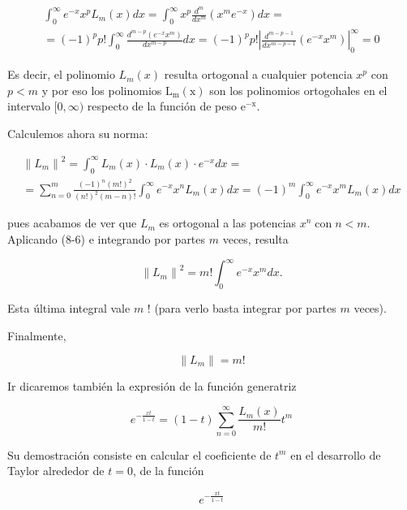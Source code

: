 \documentclass[10pt]{article}
\theoremstyle{plain}
\theoremstyle{definition}
\theoremstyle{remark}
\begin{document}
$$
\begin{gathered}
\int_{0}^{\infty} e^{-x} x^{p} L_{m}(x) d x=\int_{0}^{\infty} x^{p} \frac{d^{m}}{d x^{m}}\left(x^{m} e^{-x}\right) d x= \\
=(-1)^{p} p!\int_{0}^{\infty} \frac{d^{m-p}\left(e^{-x} x^{m}\right)}{d x^{m-p}} d x=(-1)^{p} p!\left|\frac{d^{m-p-1}}{d x^{m-p-1}}\left(e^{-x} x^{m}\right)\right|_{0}^{\infty}=0
\end{gathered}
$$

Es decir, el polinomio $L_{m}(x)$ resulta ortogonal a cualquier potencia $x^{p}$ con $p<m$ y por eso los polinomios $\mathrm{L}_{\mathrm{m}}(\mathrm{x})$ son los polinomios ortogohales en el intervalo $[0, \infty)$ respecto de la función de peso $\mathrm{e}^{-\mathrm{x}}$.

Calculemos ahora su norma:

$$
\begin{gathered}
\left\|L_{m}\right\|^{2}=\int_{0}^{\infty} L_{m}(x) \cdot L_{m}(x) \cdot e^{-x} d x= \\
=\sum_{n=0}^{m} \frac{(-1)^{n}(m!)^{2}}{(n!)^{2}(m-n)!} \int_{0}^{\infty} e^{-x} x^{n} L_{m}(x) d x=(-1)^{m} \int_{0}^{\infty} e^{-x} x^{m} L_{m}(x) d x
\end{gathered}
$$

pues acabamos de ver que $L_{m}$ es ortogonal a las potencias $x^{n} \operatorname{con} n<m$.\\
Aplicando (8-6) e integrando por partes $m$ veces, resulta

$$
\left\|L_{m}\right\|^{2}=m!\int_{0}^{\infty} e^{-x} x^{m} d x .
$$

Esta última integral vale $m$ ! (para verlo basta integrar por partes $m$ veces).

Finalmente,


\begin{equation*}
\left\|L_{m}\right\|=m! \tag{8-7}
\end{equation*}


Ir dicaremos también la expresión de la función generatriz


\begin{equation*}
e^{-\frac{x t}{1-t}}=(1-t) \sum_{n=0}^{\infty} \frac{L_{m}(x)}{m!} t^{m} \tag{8-8}
\end{equation*}


Su demostración consiste en calcular el coeficiente de $t^{m}$ en el desarrollo de Taylor alrededor de $t=0$, de la función

$$
e^{-\frac{x t}{1-t}}
$$
\end{document}

